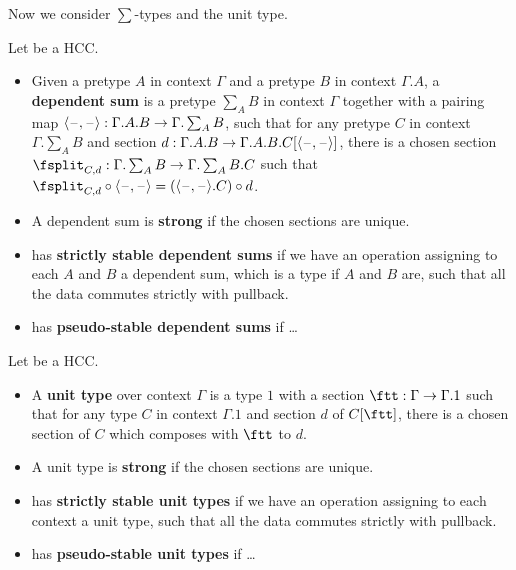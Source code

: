 \documentclass{amsart}
\begin{document}
Now we consider $\sum$-types and the unit type.

\begin{definition}
  Let \E be a HCC.
  \begin{itemize}
  \item Given a pretype $A$ in context $\Gamma$ and a pretype $B$ in context $\Gamma.A$, a \textbf{dependent sum} is a pretype $\sum_A B$ in context $\Gamma$ together with a pairing map $\langle \mathord{\hspace{1pt}\text{--}\hspace{1pt}} , \mathord{\hspace{1pt}\text{--}\hspace{1pt}} \rangle : \Gamma.A.B \to \Gamma.\sum_A B$, such that for any pretype $C$ in context $\Gamma.\sum_A B$ and section $d:\Gamma.A.B \to \Gamma.A.B.C[\langle \mathord{\hspace{1pt}\text{--}\hspace{1pt}} , \mathord{\hspace{1pt}\text{--}\hspace{1pt}} \rangle]$, there is a chosen section $\fsplit_{C,d} : \Gamma.\sum_A B \to \Gamma.\sum_A B.C$ such that $\fsplit_{C,d} \circ \pairing = (\pairing.C)\circ d$.
  \item A dependent sum is \textbf{strong} if the chosen sections are unique.
  \item \E has \textbf{strictly stable dependent sums} if we have an operation assigning to each $A$ and $B$ a dependent sum, which is a type if $A$ and $B$ are, such that all the data commutes strictly with pullback.
  \item \E has \textbf{pseudo-stable dependent sums} if \dots
  \end{itemize}
\end{definition}

\begin{definition}
  Let \E be a HCC.
  \begin{itemize}
  \item A \textbf{unit type} over context $\Gamma$ is a type $1$ with a section $\ftt : \Gamma \to \Gamma.1$ such that for any type $C$ in context $\Gamma.1$ and section $d$ of $C[\ftt]$, there is a chosen section of $C$ which composes with $\ftt$ to $d$.
  \item A unit type is \textbf{strong} if the chosen sections are unique.
  \item \E has \textbf{strictly stable unit types} if we have an operation assigning to each context a unit type, such that all the data commutes strictly with pullback.
  \item \E has \textbf{pseudo-stable unit types} if \dots
  \end{itemize}
\end{definition}
\end{document}
